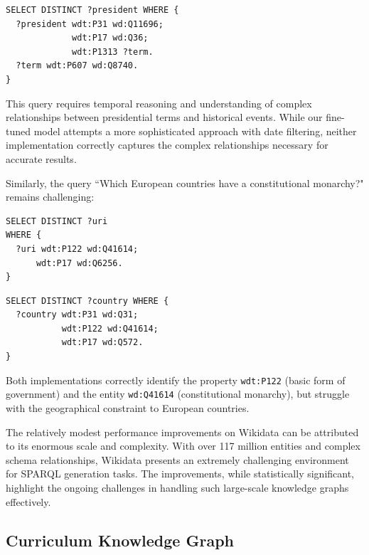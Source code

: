 \begin{lstlisting}[language=SPARQL, caption=FrOG Output for Vietnam War Presidents, label=code:vietnam-previous]
SELECT DISTINCT ?president WHERE {
  ?president wdt:P31 wd:Q11696; 
             wdt:P17 wd:Q36; 
             wdt:P1313 ?term.
  ?term wdt:P607 wd:Q8740.
}
\end{lstlisting}

This query requires temporal reasoning and understanding of complex relationships between presidential terms and historical events. While our fine-tuned model attempts a more sophisticated approach with date filtering, neither implementation correctly captures the complex relationships necessary for accurate results.

Similarly, the query ``Which European countries have a constitutional monarchy?" remains challenging:

\begin{lstlisting}[language=SPARQL, caption=Our Fine-tuned Model Output for Constitutional Monarchies, label=code:monarchy-finetuned]
SELECT DISTINCT ?uri
WHERE {
  ?uri wdt:P122 wd:Q41614;
      wdt:P17 wd:Q6256.
}
\end{lstlisting}

\begin{lstlisting}[language=SPARQL, caption=FrOG Output for Constitutional Monarchies, label=code:monarchy-previous]
SELECT DISTINCT ?country WHERE {
  ?country wdt:P31 wd:Q31; 
           wdt:P122 wd:Q41614; 
           wdt:P17 wd:Q572.
}
\end{lstlisting}

Both implementations correctly identify the property \texttt{wdt:P122} (basic form of government) and the entity \texttt{wd:Q41614} (constitutional monarchy), but struggle with the geographical constraint to European countries.

The relatively modest performance improvements on Wikidata can be attributed to its enormous scale and complexity. With over 117 million entities and complex schema relationships, Wikidata presents an extremely challenging environment for SPARQL generation tasks. The improvements, while statistically significant, highlight the ongoing challenges in handling such large-scale knowledge graphs effectively.

\subsection{Curriculum Knowledge Graph}
\label{curriculum-results}

